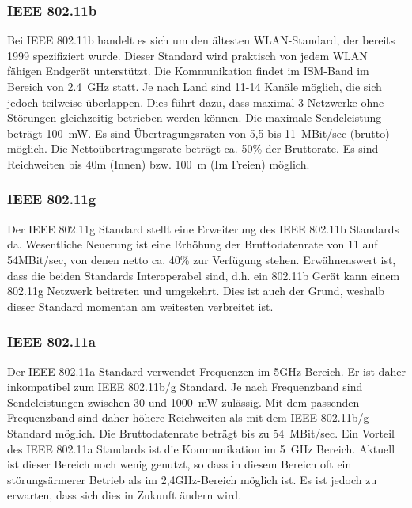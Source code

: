         \subsubsection{IEEE 802.11b}
            Bei IEEE 802.11b handelt es sich um den ältesten WLAN-Standard, der bereits 1999 
            spezifiziert wurde. Dieser Standard wird praktisch von jedem WLAN fähigen 
            Endgerät unterstützt. Die Kommunikation findet im ISM-Band im Bereich von 2.4~GHz
            statt. Je nach Land sind 11-14 Kanäle möglich, die sich jedoch teilweise überlappen.
            Dies führt dazu, dass maximal 3 Netzwerke ohne Störungen gleichzeitig betrieben werden
            können. Die maximale Sendeleistung beträgt 100~mW. Es sind Übertragungsraten von 
            5,5 bis 11~MBit/sec (brutto) möglich. Die Nettoübertragungsrate beträgt ca. 50\% der
            Bruttorate. Es sind Reichweiten bis 40m (Innen) bzw. 100~m (Im Freien) möglich\cite{WirelessNetworking}.

        \subsubsection{IEEE 802.11g}
            Der IEEE 802.11g Standard stellt eine Erweiterung des IEEE 802.11b Standards da.
            Wesentliche Neuerung ist eine Erhöhung der Bruttodatenrate von 11 auf 54MBit/sec,
            von denen netto ca. 40\% zur Verfügung stehen. Erwähnenswert ist, dass die
            beiden Standards Interoperabel sind, d.h. ein 802.11b Gerät kann einem
            802.11g Netzwerk beitreten und umgekehrt. Dies ist auch der Grund, weshalb
            dieser Standard momentan am weitesten verbreitet ist.

        \subsubsection{IEEE 802.11a}
            Der IEEE 802.11a Standard verwendet Frequenzen im 5GHz Bereich. Er ist daher
            inkompatibel zum IEEE 802.11b/g Standard. Je nach Frequenzband sind 
            Sendeleistungen zwischen 30 und 1000~mW zulässig. Mit dem passenden Frequenzband
            sind daher höhere Reichweiten als mit dem IEEE 802.11b/g Standard möglich.
            Die Bruttodatenrate beträgt bis zu 54~MBit/sec. 
            Ein Vorteil des IEEE 802.11a Standards ist die Kommunikation im 5~GHz Bereich.
            Aktuell ist dieser Bereich noch wenig genutzt, so dass in diesem
            Bereich oft ein störungsärmerer Betrieb als im 2,4GHz-Bereich möglich ist.
            Es ist jedoch zu erwarten, dass sich dies in Zukunft ändern wird.

